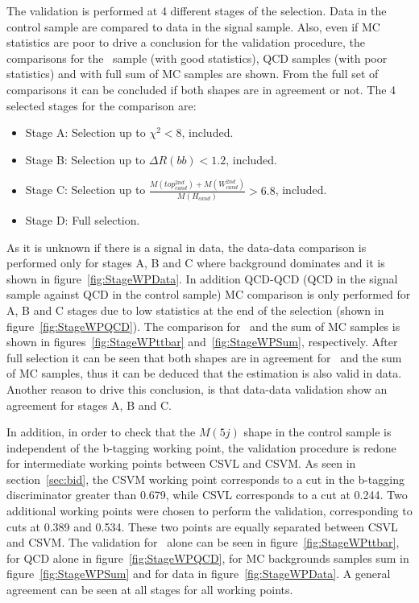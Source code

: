 The validation is performed at 4 different stages of the selection. Data in the control sample are compared to data in the signal sample. Also, even if MC statistics are poor to drive a conclusion for the validation procedure, the comparisons for the \ttbar~sample (with good statistics), QCD samples (with poor statistics) and with full sum of MC samples are shown. From the full set of comparisons it can be concluded if both shapes are in agreement or not. The 4 selected stages for the comparison are:
\begin{itemize}
\item Stage A: Selection up to $\chi^{2}<8$, included.
\item Stage B: Selection up to $\Delta R(bb) <1.2$, included.
\item Stage C: Selection up to $\frac{M(top^{2nd}_{cand})+M(W^{2nd}_{cand})}{M(H_{cand})}>6.8$, included.
\item Stage D: Full selection.
\end{itemize}

As it is unknown if there is a signal in data, the data-data comparison is performed only for stages A, B and C where background dominates and it is shown in figure~\ref{fig:StageWPData}. In addition QCD-QCD (QCD in the signal sample against QCD in the control sample) MC comparison is only performed for A, B and C stages due to low statistics at the end of the selection (shown in figure~\ref{fig:StageWPQCD}). The comparison for \ttbar~and the sum of MC samples is shown in figures~\ref{fig:StageWPttbar} and~\ref{fig:StageWPSum}, respectively. After full selection it can be seen that both shapes are in agreement for \ttbar~and the sum of MC samples, thus it can be deduced that the estimation is also valid in data. Another reason to drive this conclusion, is that data-data validation show an agreement for stages A, B and C.

In addition, in order to check that the $M(5j)$ shape in the control sample is independent of the b-tagging working point, the validation procedure is redone for intermediate working points between CSVL and CSVM. As seen in section~\ref{sec:bid}, the CSVM working point corresponds to a cut in the b-tagging discriminator greater than 0.679, while CSVL corresponds to a cut at 0.244. Two additional working points were chosen to perform the validation, corresponding to cuts at 0.389 and 0.534. These two points are equally separated between CSVL and CSVM. The validation for \ttbar~alone can be seen in figure~\ref{fig:StageWPttbar}, for QCD alone in figure~\ref{fig:StageWPQCD}, for MC backgrounds samples sum in figure~\ref{fig:StageWPSum} and for data in figure~\ref{fig:StageWPData}. A general agreement can be seen at all stages for all working points.

